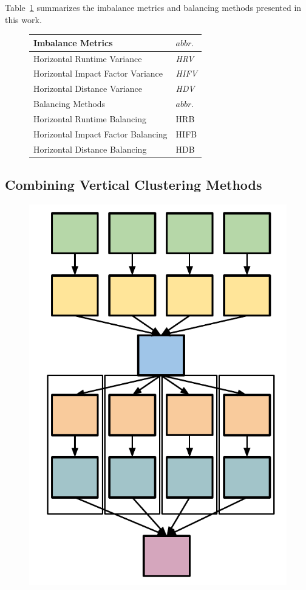 Table~\ref{tab:2} summarizes the imbalance metrics and balancing methods presented in this work. 

\begin{figure}[htb]
	\centering
	\small
	\begin{tabular}{l|l}
		\hline
		Imbalance Metrics & $abbr.$   \\
		\hline
		Horizontal Runtime Variance & \emph{HRV}   \\ 
		Horizontal Impact Factor Variance & \emph{HIFV} \\ 
		Horizontal Distance Variance & \emph{HDV}  \\ 
		\hline
		Balancing Methods & $abbr.$  \\
		\hline
		Horizontal Runtime Balancing & HRB   \\ 
		Horizontal Impact Factor Balancing & HIFB\\ 
		Horizontal Distance Balancing & HDB \\ 
		\hline
	\end{tabular}
	\label{tab:2}
\end{figure}
\subsection{Combining Vertical Clustering Methods}
\label{sec:vertical}
\begin{figure}[htb]
	\centering
	\includegraphics[width=0.35\linewidth]{figures/imbalance/vertical_clustering.pdf}
	\label{fig:imbalance_vc}
\end{figure}


